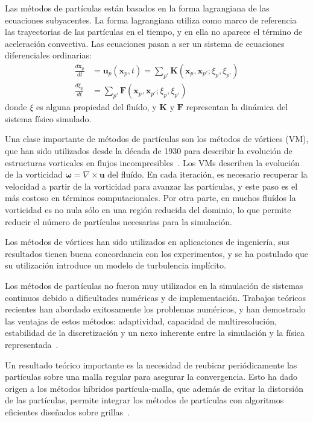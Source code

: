 \documentclass[11pt,spanish]{article}
\newcommand{\vel}{\mathbf{u}}
\newcommand{\vort}{\mathbf{\omega}}
\newcommand{\pos}{\mathbf{x}}
\begin{document}
Las métodos de partículas están basados en la forma lagrangiana de las
ecuaciones subyacentes.  La forma lagrangiana utiliza como marco de referencia
las trayectorias de las partículas en el tiempo, y en ella no aparece el término
de aceleración convectiva.  Las ecuaciones pasan a ser un sistema de ecuaciones
diferenciales ordinarias:
\begin{align}
    \frac{d\pos_p}{dt} &= \vel_p(\pos_p, t) =
        \sum_{p'} \mathbf{K}(\pos_p, \pos_{p'}; \xi_p, \xi_{p'}) \\
    \frac{d\xi_p}{dt} &=
        \sum_{p'} \mathbf{F}(\pos_p, \pos_{p'}; \xi_p, \xi_{p'})
\end{align}
donde $\xi$ es alguna propiedad del fluído, y $\mathbf{K}$ y $\mathbf{F}$ 
representan la dinámica del sistema físico simulado.

Una clase importante de métodos de partículas son los métodos de vórtices (VM),
que han sido utilizados desde la década de 1930 para describir la evolución de
estructuras vorticales en flujos incompresibles~\cite[\S2.2]{multiscale}.  Los
VMs describen la evolución de la vorticidad $\vort = \nabla\times\vel$ del
fluído.  En cada iteración, es necesario recuperar la velocidad a partir de la
vorticidad para avanzar las partículas, y este paso es el más costoso en
términos computacionales.  Por otra parte, en muchos fluídos la vorticidad es
no nula sólo en una región reducida del dominio, lo que permite reducir el
número de partículas necesarias para la simulación.

Los métodos de vórtices han sido utilizados en aplicaciones de ingeniería,
sus resultados tienen buena concordancia con los experimentos, y se ha postulado
que su utilización introduce un modelo de turbulencia implícito.

Los métodos de partículas no fueron muy utilizados en la simulación de sistemas
continuos debido a dificultades numéricas y de implementación.  Trabajos
teóricos recientes han abordado exitosamente los problemas numéricos, y han
demostrado las ventajas de estos métodos:  adaptividad, capacidad de
multiresolución, estabilidad de la discretización y un nexo inherente entre
la simulación y la física representada~\cite{ppm}.

Un resultado teórico importante es la necesidad de reubicar periódicamente
las partículas sobre una malla regular para asegurar la convergencia.  Esto ha
dado origen a los métodos híbridos partícula-malla, que además de evitar la
distorsión de las partículas, permite integrar los métodos de partículas con
algoritmos eficientes diseñados sobre grillas~\cite[\S3]{multiscale}.
\end{document}
